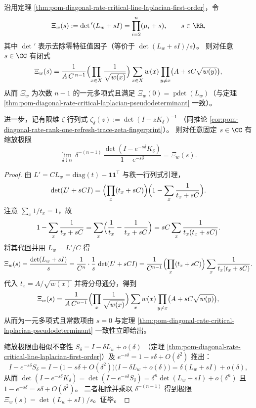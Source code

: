 \begin{theorem}\label{thm:pom-diagonal-rate-critical-xi-polynomial-and-zeta-scaling}
沿用定理 \ref{thm:pom-diagonal-rate-critical-line-laplacian-first-order}，令
\[
\Xi_w(s):=\det{}'(L_w+sI)=\prod_{i=2}^{n}(\mu_i+s),\qquad s\in\RR,
\]
其中 \(\det{}'\) 表示去除零特征值因子（等价于 \(\det(L_w+sI)/s\)）。
则对任意 \(s\in\CC\) 有闭式
\[
\Xi_w(s)
=\frac{1}{A\,C^{\,n-1}}\Bigl(\prod_{x\in X}\frac{1}{\sqrt{w(x)}}\Bigr)
\sum_{x\in X} w(x)\prod_{y\ne x}\bigl(A+sC\sqrt{w(y)}\bigr),
\]
从而 \(\Xi_w\) 为次数 \(n-1\) 的一元多项式且满足 \(\Xi_w(0)=\operatorname{pdet}(L_w)\)（与定理 \ref{thm:pom-diagonal-rate-critical-laplacian-pseudodeterminant} 一致）。
\par
进一步，记有限维 \(\zeta\) 行列式
\(
\zeta_\delta(z):=\det(I-zK_\delta)^{-1}
\)
（同推论 \ref{cor:pom-diagonal-rate-rank-one-refresh-trace-zeta-fingerprint}）。
则对任意固定 \(s\in\CC\) 有缩放极限
\[
\lim_{\delta\downarrow 0}\ \delta^{-(n-1)}\,
\frac{\det(I-e^{-s\delta}K_\delta)}{1-e^{-s\delta}}
=\Xi_w(s).
\]
\end{theorem}
\begin{proof}
由 \(L'=CL_w=\mathrm{diag}(t)-\mathbf 1\mathbf 1^{\mathsf T}\) 与秩一行列式引理，
\[
\det(L'+sCI)
=\Bigl(\prod_x(t_x+sC)\Bigr)\Bigl(1-\sum_x\frac{1}{t_x+sC}\Bigr).
\]
注意 \(\sum_x 1/t_x=1\)，故
\[
1-\sum_x\frac{1}{t_x+sC}
=\sum_x\Bigl(\frac{1}{t_x}-\frac{1}{t_x+sC}\Bigr)
=sC\sum_x\frac{1}{t_x(t_x+sC)}.
\]
将其代回并用 \(L_w=L'/C\) 得
\[
\Xi_w(s)=\frac{\det(L_w+sI)}{s}
=\frac{1}{C^{n}}\cdot \frac{1}{s}\,\det(L'+sCI)
=\frac{1}{C^{n-1}}\Bigl(\prod_x(t_x+sC)\Bigr)\sum_x\frac{1}{t_x(t_x+sC)}.
\]
代入 \(t_x=A/\sqrt{w(x)}\) 并将分母通分，得到
\[
\Xi_w(s)=\frac{1}{A\,C^{n-1}}\Bigl(\prod_{x}\frac{1}{\sqrt{w(x)}}\Bigr)\sum_{x}w(x)\prod_{y\ne x}\bigl(A+sC\sqrt{w(y)}\bigr),
\]
从而为一元多项式且常数项由 \(s=0\) 与定理 \ref{thm:pom-diagonal-rate-critical-laplacian-pseudodeterminant} 一致性立即给出。
\par
缩放极限由相似不变性
\(
S_\delta=I-\delta L_w+o(\delta)
\)
（定理 \ref{thm:pom-diagonal-rate-critical-line-laplacian-first-order}）及
\(
e^{-s\delta}=1-s\delta+O(\delta^2)
\)
推出：
\[
I-e^{-s\delta}S_\delta
=I-\bigl(1-s\delta+O(\delta^2)\bigr)\bigl(I-\delta L_w+o(\delta)\bigr)
=\delta(L_w+sI)+o(\delta),
\]
从而
\(
\det(I-e^{-s\delta}K_\delta)=\det(I-e^{-s\delta}S_\delta)=\delta^{n}\det(L_w+sI)+o(\delta^{n})
\)
且
\(
1-e^{-s\delta}=s\delta+O(\delta^2)
\)。
二者相除并乘以 \(\delta^{-(n-1)}\) 得到极限 \(\Xi_w(s)=\det(L_w+sI)/s\)。证毕。
\end{proof}

